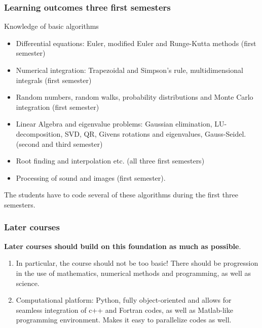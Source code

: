 \documentclass{beamer}
\begin{document}
\begin{frame}
\frametitle{Learning outcomes three first semesters}

\begin{block}{Knowledge of basic algorithms }

\begin{itemize}
\item Differential equations: Euler, modified Euler and Runge-Kutta methods (first semester)

\item Numerical integration: Trapezoidal and Simpson's rule, multidimensional integrals (first semester)

\item Random numbers, random walks, probability distributions and Monte Carlo integration  (first semester)

\item Linear Algebra and eigenvalue problems: Gaussian elimination, LU-decomposition, SVD, QR, Givens rotations and eigenvalues, Gauss-Seidel. (second and third semester)

\item Root finding and interpolation etc. (all three first semesters)

\item Processing of sound and images (first semester).
\end{itemize}

\noindent
The students have to code several of these algorithms during the first three semesters.
\end{block}
\end{frame}

\begin{frame}
\frametitle{Later courses}

\begin{block}{}

\textbf{Later courses should build on this foundation as much as possible}.

\begin{enumerate}
\item In particular, the course should not be too basic! There should be progression in the use of mathematics, numerical methods and programming, as well as science.

\item Computational platform: Python, fully object-oriented and allows for seamless integration of c++ and Fortran codes, as well as Matlab-like programming environment. Makes it easy to parallelize codes as well.
\end{enumerate}

\noindent
\end{block}
\end{frame}
\end{document}

